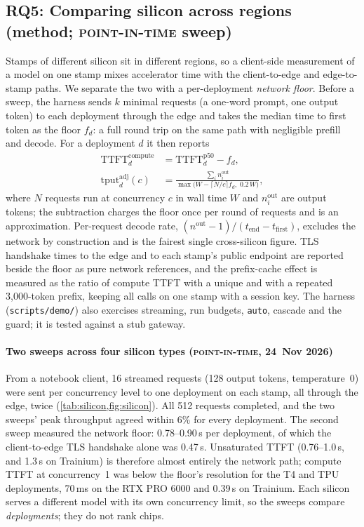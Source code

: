 \documentclass[conference,letterpaper]{IEEEtran}
\newcommand{\code}[1]{\texttt{\small #1}}
\newcommand{\ev}[1]{{\normalfont\textsc{#1}}}
\newcommand{\PointInTime}{\ev{point-in-time}}
\begin{document}
\subsection{RQ5: Comparing silicon across regions \normalfont(method; \PointInTime{} sweep)}
\label{sec:eval-silicon}
Stamps of different silicon sit in different regions, so a client-side measurement of a model on
one stamp mixes accelerator time with the client-to-edge and edge-to-stamp paths. We separate the
two with a per-deployment \emph{network floor}. Before a sweep, the harness sends $k$ minimal
requests (a one-word prompt, one output token) to each deployment through the edge and takes the
median time to first token as the floor $f_d$: a full round trip on the same path with negligible
prefill and decode. For a deployment $d$ it then reports
\begin{align}
\mathrm{TTFT}^{\mathrm{compute}}_d &= \mathrm{TTFT}^{\mathrm{p50}}_d - f_d, \\
\mathrm{tput}^{\mathrm{adj}}_d(c) &= \frac{\sum_i n^{\mathrm{out}}_i}{\max\!\big(W - \lceil N/c\rceil f_d,\; 0.2\,W\big)},
\end{align}
where $N$ requests run at concurrency $c$ in wall time $W$ and $n^{\mathrm{out}}_i$ are output
tokens; the subtraction charges the floor once per round of requests and is an approximation.
Per-request decode rate, $(n^{\mathrm{out}}-1)/(t_{\mathrm{end}}-t_{\mathrm{first}})$, excludes
the network by construction and is the fairest single cross-silicon figure. TLS handshake times to
the edge and to each stamp's public endpoint are reported beside the floor as pure network
references, and the prefix-cache effect is measured as the ratio of compute TTFT with a unique and
with a repeated 3{,}000-token prefix, keeping all calls on one stamp with a session key. The
harness (\code{scripts/demo/}) also exercises streaming, run budgets, \code{auto}, cascade and the
guard; it is tested against a stub gateway.

\paragraph*{Two sweeps across four silicon types (\PointInTime{}, 24~Nov 2026)}
From a notebook client, 16 streamed requests (128 output tokens, temperature~0) were sent per
concurrency level to one deployment on each stamp, all through the edge, twice
(\cref{tab:silicon,fig:silicon}). All 512 requests completed, and the two sweeps' peak throughput
agreed within 6\% for every deployment. The second sweep measured the network floor: 0.78--0.90\,s
per deployment, of which the client-to-edge TLS handshake alone was 0.47\,s. Unsaturated TTFT
(0.76--1.0\,s, and 1.3\,s on Trainium) is therefore almost entirely the network path; compute TTFT
at concurrency~1 was below the floor's resolution for the T4 and TPU deployments, 70\,ms on the RTX
PRO 6000 and 0.39\,s on Trainium. Each silicon serves a different model with its own concurrency
limit, so the sweeps compare \emph{deployments}; they do not rank chips.
\end{document}
